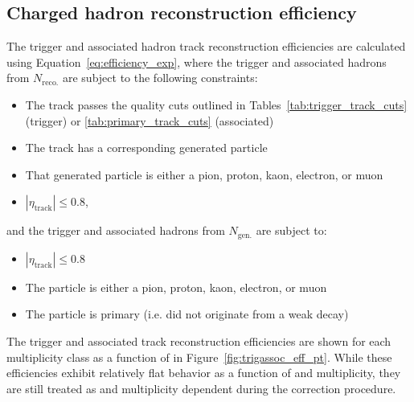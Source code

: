 \subsection{Charged hadron reconstruction efficiency}

The trigger and associated hadron track reconstruction efficiencies are calculated using Equation~\ref{eq:efficiency_exp}, where the trigger and associated hadrons from $N_{\text{reco.}}$ are subject to the following constraints:
%
\begin{itemize}
	\item The track passes the quality cuts outlined in Tables~\ref{tab:trigger_track_cuts} (trigger) or \ref{tab:primary_track_cuts} (associated)
	\item The track has a corresponding generated particle
	\item That generated particle is either a pion, proton, kaon, electron, or muon
	\item $|\eta_{\text{track}}| \leq 0.8$,
\end{itemize}
%
and the trigger and associated hadrons from $N_{\text{gen.}}$ are subject to:
%
\begin{itemize}
	\item $|\eta_{\text{track}}| \leq 0.8$
	\item The particle is either a pion, proton, kaon, electron, or muon
	\item The particle is primary (i.e. did not originate from a weak decay)
\end{itemize}
%
The trigger and associated track reconstruction efficiencies are shown for each multiplicity class as a function of \pt in Figure~\ref{fig:trigassoc_eff_pt}. While these efficiencies exhibit relatively flat behavior as a function of \pt and multiplicity, they are still treated as \pt and multiplicity dependent during the correction procedure.

